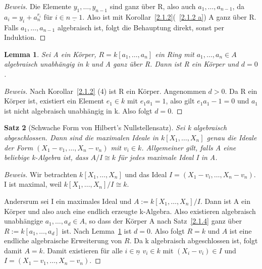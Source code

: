 \documentclass{article}
\newtheorem{satz}{Satz}
\newtheorem{lemma}[satz]{Lemma}
\begin{document}
\begin{proof}[Beweis]
	Die Elemente \(y_1,\ldots,y_{n-1}\) sind ganz über R, also auch \(a_1,\ldots,
	a_{n-1}\), da \(a_i = y_i + a_n^{r_i}\) für \(i \in \underline{n-1}\).
	Also ist mit Korollar~\ref{2.1.2}(~\ref{2.1.2 a}) A ganz über R. Falls
	\(a_1,\ldots,a_{n-1}\) algebraisch ist, folgt die Behauptung direkt, sonst
	per Induktion.
	\end{proof}

	\begin{lemma}\label{hilfslemma}
	Sei A ein Körper, \(R = k[a_1, \ldots, a_n]\) ein Ring mit \(a_1, \ldots,
	a_n \in A\) algebraisch unabhängig in k und A ganz über R.
	Dann ist R ein Körper und \(d = 0\).
	\end{lemma}

	\begin{proof}[Beweis]
	Nach Korollar~\ref{2.1.2} (4) ist R ein Körper. Angenommen \(d > 0\).
	Da R ein Körper ist, existiert ein Element \(e_1 \in k\) mit \(e_1a_1 = 1\),
	also gilt \(e_1a_1 - 1 = 0\) und \(a_1\) ist nicht algebraisch unabhängig in k.
	Also folgt \(d = 0\).
	\end{proof}

	\begin{satz}[Schwache Form von Hilbert's Nullstellensatz]\label{schwach}
	Sei k algebraisch abgeschlossen. Dann sind die maximalen Ideale in
	\(k[X_1, \ldots, X_n]\) genau die Ideale der Form \((X_1-v_1,\ldots,
	X_n-v_n)\) mit \(v_i \in k\). Allgemeiner gilt, falls A eine beliebige
	k-Algebra ist, dass \(A/I \cong k\) für jedes maximale Ideal I in A.
	\end{satz}

	\begin{proof}[Beweis]
	Wir betrachten \(k[X_1, \ldots, X_n]\) und das Ideal \(I = (X_1 - v_i,
	\ldots, X_n - v_n)\). I ist maximal, weil \(k[X_1, \ldots, X_n]/I \cong k\).

	Andersrum sei I ein maximales Ideal und \(A := k[X_1, \ldots, X_n]/I\).
	Dann ist A ein Körper und also auch eine endlich erzeugte k-Algebra. Also
	existieren algebraisch unabhängige \(a_1, \ldots, a_d \in A\), so dass
	der Körper A nach Satz~\ref{2.1.4} ganz über \(R := k[a_1,\ldots, a_d]\) ist.
	Nach Lemma~\ref{hilfslemma} ist \(d = 0\).
	Also folgt \(R = k\) und \(A\) ist eine endliche algebraische Erweiterung von
	\(R\). Da k algebraisch abgeschlossen ist, folgt damit \(A = k\).
	Damit existieren für alle \(i \in \underline{n}\) \(v_i \in k\) mit
	\((X_i - v_i) \in I\) und \(I = (X_1 - v_1, \ldots, X_n - v_n)\).
	\end{proof}
\end{document}
